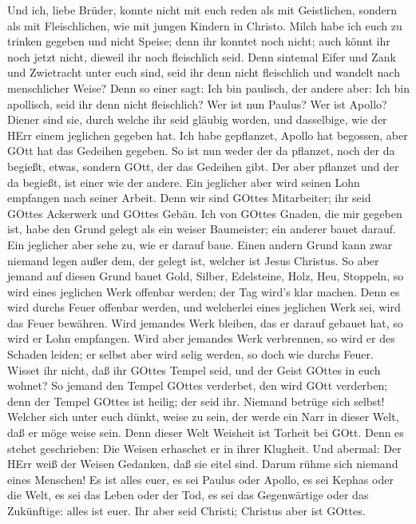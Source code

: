  Und ich, liebe Brüder, konnte nicht mit euch reden als mit
Geistlichen, sondern als mit Fleischlichen, wie mit jungen Kindern in
Christo.  Milch habe ich euch zu trinken gegeben und nicht
Speise; denn ihr konntet noch nicht; auch könnt ihr noch jetzt nicht,
 dieweil ihr noch fleischlich seid. Denn sintemal Eifer und
Zank und Zwietracht unter euch sind, seid ihr denn nicht fleischlich und
wandelt nach menschlicher Weise?  Denn so einer sagt: Ich
bin paulisch, der andere aber: Ich bin apollisch, seid ihr denn nicht
fleischlich?  Wer ist nun Paulus? Wer ist Apollo? Diener
sind sie, durch welche ihr seid gläubig worden, und dasselbige, wie der
HErr einem jeglichen gegeben hat.  Ich habe gepflanzet,
Apollo hat begossen, aber GOtt hat das Gedeihen gegeben.  So
ist nun weder der da pflanzet, noch der da begießt, etwas, sondern GOtt,
der das Gedeihen gibt.  Der aber pflanzet und der da
begießt, ist einer wie der andere. Ein jeglicher aber wird seinen Lohn
empfangen nach seiner Arbeit.  Denn wir sind GOttes
Mitarbeiter; ihr seid GOttes Ackerwerk und GOttes Gebäu. 
Ich von GOttes Gnaden, die mir gegeben ist, habe den Grund gelegt als
ein weiser Baumeister; ein anderer bauet darauf. Ein jeglicher aber sehe
zu, wie er darauf baue.  Einen andern Grund kann zwar
niemand legen außer dem, der gelegt ist, welcher ist Jesus Christus.
 So aber jemand auf diesen Grund bauet Gold, Silber,
Edelsteine, Holz, Heu, Stoppeln,  so wird eines jeglichen
Werk offenbar werden; der Tag wird's klar machen. Denn es wird durchs
Feuer offenbar werden, und welcherlei eines jeglichen Werk sei, wird das
Feuer bewähren.  Wird jemandes Werk bleiben, das er darauf
gebauet hat, so wird er Lohn empfangen.  Wird aber jemandes
Werk verbrennen, so wird er des Schaden leiden; er selbst aber wird
selig werden, so doch wie durchs Feuer.  Wisset ihr nicht,
daß ihr GOttes Tempel seid, und der Geist GOttes in euch wohnet?
 So jemand den Tempel GOttes verderbet, den wird GOtt
verderben; denn der Tempel GOttes ist heilig; der seid ihr.
 Niemand betrüge sich selbst! Welcher sich unter euch
dünkt, weise zu sein, der werde ein Narr in dieser Welt, daß er möge
weise sein.  Denn dieser Welt Weisheit ist Torheit bei
GOtt. Denn es stehet geschrieben: Die Weisen erhaschet er in ihrer
Klugheit.  Und abermal: Der HErr weiß der Weisen Gedanken,
daß sie eitel sind.  Darum rühme sich niemand eines
Menschen! Es ist alles euer,  es sei Paulus oder Apollo, es
sei Kephas oder die Welt, es sei das Leben oder der Tod, es sei das
Gegenwärtige oder das Zukünftige: alles ist euer.  Ihr aber
seid Christi; Christus aber ist GOttes.

